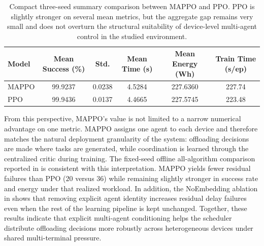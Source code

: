 \begin{table}[htbp]
    \centering
    \footnotesize
    \setlength{\tabcolsep}{4pt}
    \begin{tabular}{l|ccccc}
        \hline
        \textbf{Model} & \textbf{Mean Success (\%)} & \textbf{Std.} & \textbf{Mean Time (s)} & \textbf{Mean Energy (Wh)} & \textbf{Train Time (s/ep)} \\
        \hline
        MAPPO & 99.9237 & 0.0238 & 4.5284 & 227.6360 & 227.74 \\
        PPO & 99.9436 & 0.0137 & 4.4665 & 227.5745 & 223.48 \\
        \hline
    \end{tabular}
    \caption{Compact three-seed summary comparison between MAPPO and PPO. PPO is slightly stronger on several mean metrics, but the aggregate gap remains very small and does not overturn the structural suitability of device-level multi-agent control in the studied environment.}
    \label{tab:mappo-ppo-summary}
\end{table}

From this perspective, MAPPO's value is not limited to a narrow numerical advantage on one metric. MAPPO assigns one agent to each device and therefore matches the natural deployment granularity of the system: offloading decisions are made where tasks are generated, while coordination is learned through the centralized critic during training. The fixed-seed offline all-algorithm comparison reported in  is consistent with this interpretation. MAPPO yields fewer residual failures than PPO (\(20\) versus \(36\)) while remaining slightly stronger in success rate and energy under that realized workload. In addition, the NoEmbedding ablation in  shows that removing explicit agent identity increases residual delay failures even when the rest of the learning pipeline is kept unchanged. Together, these results indicate that explicit multi-agent conditioning helps the scheduler distribute offloading decisions more robustly across heterogeneous devices under shared multi-terminal pressure.

